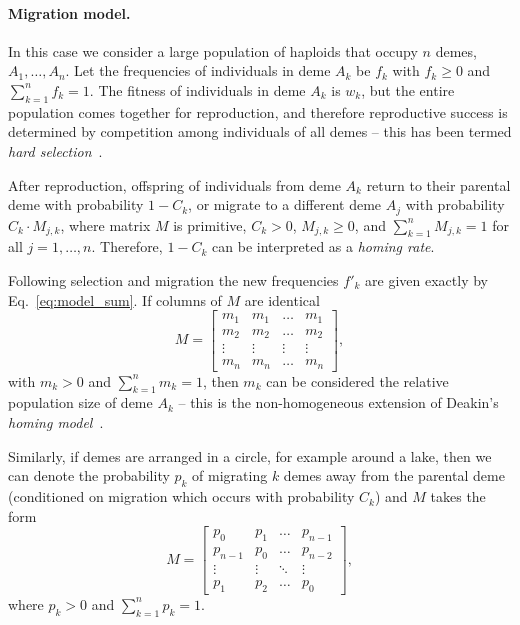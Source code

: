 \documentclass[9pt, a4paper, twocolumn]{extarticle}
\begin{document}
\paragraph*{Migration model.}\label{sec:mig_model}

In this case we consider a large population of haploids that occupy $n$ demes, $A_1, \ldots, A_n$.
Let the frequencies of individuals in deme $A_k$ be $f_k$ with $f_k \ge 0$ and $\sum_{k=1}^{n}{f_k} = 1$.
The fitness of individuals in deme $A_k$ is $w_k$, but the entire population comes together for reproduction, and therefore reproductive success is determined by competition among individuals of all demes -- this has been termed \emph{hard selection}~\citep{Wallace1975,Karlin1982}.

After reproduction, offspring of individuals from deme $A_k$ return to their parental deme with probability $1-C_k$, or migrate to a different deme $A_j$ with probability $C_k \cdot M_{j,k}$, where matrix $M$ is primitive, $C_k > 0$, $M_{j,k} \ge 0$, and $\sum_{k=1}^{n}{M_{j,k}} = 1$ for all $j=1, \ldots, n$.
Therefore, $1-C_k$ can be interpreted as a \emph{homing rate}.

Following selection and migration the new frequencies $f'_k$ are given exactly by Eq.~\ref{eq:model_sum}.
If columns of ${M}$ are identical
\begin{equation}
{M} = \begin{bmatrix}
m_1 & m_1 & \ldots & m_1 \\
m_2 & m_2 & \ldots & m_2 \\
\vdots & \vdots & \vdots & \vdots \\
m_n & m_n & \ldots & m_n
\end{bmatrix},
\end{equation}
with $m_k>0$ and $\sum_{k=1}^{n}{m_k}=1$,
then $m_k$ can be considered the relative population size of deme $A_k$ --
this is the non-homogeneous extension of Deakin's \emph{homing model}~\citep{Deakin1966,Karlin1982}.

Similarly, if demes are arranged in a circle, for example around a lake, 
then we can denote the probability $p_k$ of migrating $k$ demes away from the parental deme (conditioned on migration which occurs with probability $C_k$)
and ${M}$ takes the form
\begin{equation}
{M} = \begin{bmatrix}
p_0 & p_1 & \ldots & p_{n-1} \\
p_{n-1} & p_0 & \ldots & p_{n-2} \\
\vdots & \vdots & \ddots & \vdots \\
p_1 & p_2 & \ldots & p_0
\end{bmatrix},
\end{equation}
where $p_k > 0$ and $\sum_{k=1}^{n}{p_k}=1$.
\end{document}
